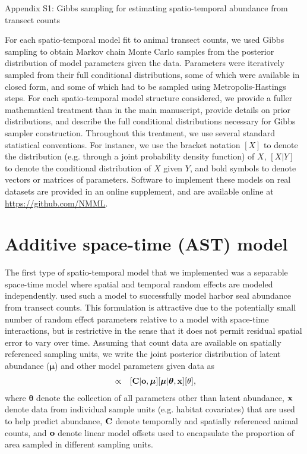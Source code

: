 \documentclass[12pt,fleqn]{article}
\begin{document}
\rm \begin{flushleft}

\raggedbottom

\begin{center}
Appendix S1: Gibbs sampling for estimating spatio-temporal abundance from transect counts
\bigskip
\end{center}

\doublespacing
For each spatio-temporal model fit to animal transect counts, we used Gibbs sampling \citep[see e.g.][]{GelmanEtAl2004} to obtain Markov chain Monte Carlo samples from the posterior distribution of model parameters given the data.  Parameters were iteratively sampled from their full conditional distributions, some of
which were available in closed form, and some of which had to be sampled using Metropolis-Hastings steps.  For each spatio-temporal model structure considered, we provide a fuller mathematical treatment than in the main manuscript, provide details on prior distributions, and describe the full conditional distributions necessary for Gibbs sampler construction.  Throughout this treatment, we use several standard statistical conventions.  For instance, we use the bracket notation $[X]$ to denote the distribution (e.g. through a joint probability density function) of $X$, $[X|Y]$ to denote the conditional distribution of $X$ given $Y$, and bold symbols to denote vectors or matrices of parameters. Software to implement these models on real datasets are provided in an online supplement, and are available online at \url{https://github.com/NMML}.

\section{Additive space-time (AST) model}

The first type of spatio-temporal model that we implemented was a separable space-time model where spatial and temporal random effects are modeled independently.  \citet{VerHoefJansen2007} used such a model to successfully model harbor seal abundance from transect counts.  This formulation is attractive due to the potentially small number of random effect parameters relative to a model with space-time interactions, but is restrictive in the sense that it does not permit residual spatial error to vary over time.  Assuming that count data are available on spatially referenced sampling units, we write the joint posterior distribution of latent abundance ($\boldsymbol{\mu}$) and other model parameters given data as
\begin{eqnarray}
  [\boldsymbol{\mu},\boldsymbol{\theta} | {\bf x},{\bf C},{\bf o}] & \propto & [{\bf C} | {\bf o}, \boldsymbol{\mu}] [\boldsymbol{\mu} | \boldsymbol{\theta},{\bf x}] [\theta],
  \label{eq:hmod}
\end{eqnarray}
where $\boldsymbol{\theta}$ denote the collection of all parameters other than latent abundance, ${\bf x}$ denote data from individual sample units (e.g. habitat covariates) that are used to help predict abundance, ${\bf C}$ denote temporally and spatially referenced animal counts, and ${\bf o}$ denote linear model offsets used to encapsulate the proportion of area sampled in different sampling units.


\end{flushleft}
\end{document}
